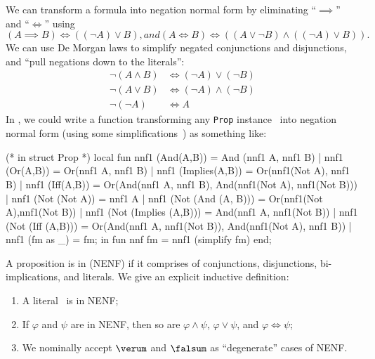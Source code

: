 \begin{node}
\begin{node}\label{prop-000R}%
We can transform a formula into negation normal form by eliminating
``$\implies$'' and ``$\iff$'' using
\begin{subequations}
\begin{equation}
(A\implies B) \iff ((\neg A)\lor B),
\end{equation}
and
\begin{equation}
(A\iff B)\iff((A\lor\neg B)\land((\neg A)\lor B)).
\end{equation}
\end{subequations}
We can use De Morgan laws to simplify negated conjunctions and
disjunctions, and ``pull negations down to the literals'':
\begin{subequations}
  \begin{align}
    \neg(A\land B) &\iff (\neg A)\lor(\neg B)\\
    \neg(A\lor B) &\iff (\neg A)\land(\neg B)\\
    \neg(\neg A) &\iff A
\end{align}
\end{subequations}
In \SML, we could write a function transforming any \verb|Prop|
instance~ into negation normal form (using some
simplifications~) as something like:
\begin{sml}
(* in struct Prop *)
local
  fun nnf1 (And(A,B)) = And (nnf1 A, nnf1 B)
    | nnf1 (Or(A,B)) = Or(nnf1 A, nnf1 B)
    | nnf1 (Implies(A,B)) = Or(nnf1(Not A), nnf1 B)
    | nnf1 (Iff(A,B)) = Or(And(nnf1 A, nnf1 B),
                           And(nnf1(Not A), nnf1(Not B)))
    | nnf1 (Not (Not A)) = nnf1 A
    | nnf1 (Not (And (A, B))) = Or(nnf1(Not A),nnf1(Not B))
    | nnf1 (Not (Implies (A,B))) = And(nnf1 A, nnf1(Not B))
    | nnf1 (Not (Iff (A,B))) = Or(And(nnf1 A, nnf1(Not B)),
                                 And(nnf1(Not A), nnf1 B))
    | nnf1 (fm as _) = fm;
in
  fun nnf fm = nnf1 (simplify fm)
end;
\end{sml}
\end{node}

\begin{definition}\label{prop-normal-form-0000}%
A proposition is in  (NENF) if
it comprises of conjunctions, disjunctions, bi-implications, and literals.
We give an explicit inductive definition:
\begin{enumerate}
\item A literal~ is in NENF;
\item If $\varphi$ and $\psi$ are in NENF, then so are
  $\varphi\land\psi$, $\varphi\lor\psi$, and $\varphi\iff\psi$;
\item We nominally accept $\verum$ and $\falsum$ as ``degenerate'' cases
  of NENF.
\end{enumerate}


\end{definition}
\end{node}

